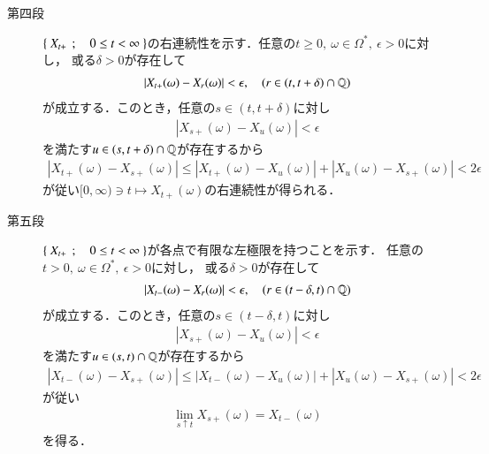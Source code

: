 \begin{prf}
\begin{description}
			\item[第四段]
				$\left\{\ X_{t+}\ \, ; \quad 0 \leq t < \infty\ \right\}$の右連続性を示す．任意の$t \geq 0,\ \omega \in \Omega^*,\ \epsilon > 0$に対し，
				或る$\delta > 0$が存在して
				\begin{align}
					\left| X_{t+}(\omega) - X_r(\omega) \right| < \epsilon,
					\quad (r \in (t,t+\delta) \cap \mathbb{Q})
				\end{align}
				が成立する．このとき，任意の$s \in (t, t+\delta)$に対し
				\begin{align}
					\left| X_{s+}(\omega) - X_u(\omega) \right| < \epsilon
				\end{align}
				を満たす$u \in (s,t+\delta) \cap \mathbb{Q}$が存在するから
				\begin{align}
					\left| X_{t+}(\omega) - X_{s+}(\omega) \right|
					\leq \left| X_{t+}(\omega) - X_u(\omega) \right|
						+ \left| X_u(\omega) - X_{s+}(\omega) \right|
					< 2\epsilon
				\end{align}
				が従い$[0,\infty) \ni t \longmapsto X_{t+}(\omega)$の右連続性が得られる．
				
			\item[第五段]
				$\left\{\ X_{t+}\ \, ; \quad 0 \leq t < \infty\ \right\}$が各点で有限な左極限を持つことを示す．
				任意の$t > 0,\ \omega \in \Omega^*,\ \epsilon > 0$に対し，
				或る$\delta > 0$が存在して
				\begin{align}
					\left| X_{t-}(\omega) - X_r(\omega) \right| < \epsilon,
					\quad (r \in (t - \delta,t) \cap \mathbb{Q})
				\end{align}
				が成立する．このとき，任意の$s \in (t-\delta,t)$に対し
				\begin{align}
					\left| X_{s+}(\omega) - X_u(\omega) \right| < \epsilon
				\end{align}
				を満たす$u \in (s,t) \cap \mathbb{Q}$が存在するから
				\begin{align}
					\left| X_{t-}(\omega) - X_{s+}(\omega) \right|
					\leq \left| X_{t-}(\omega) - X_u(\omega) \right|
						+ \left| X_u(\omega) - X_{s+}(\omega) \right|
					< 2\epsilon
				\end{align}
				が従い
				\begin{align}
					\lim_{s \uparrow t} X_{s+}(\omega) = X_{t-}(\omega)
				\end{align}
				を得る．
				\QED
		\end{description}
	\end{prf}
